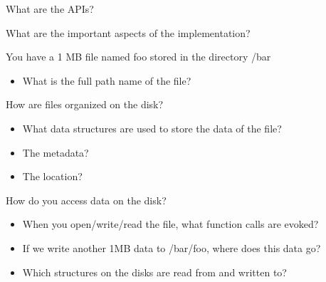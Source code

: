 \begin{slide}


    What are the APIs?
    \bigskip

    What are the important aspects of the implementation?

\end{slide}

\begin{slide}


    You have a 1 MB file named foo stored in the directory /bar
    \begin{itemize}
        \item What is the full path name of the file?
    \end{itemize}
    \bigskip

    How are files organized on the disk? 
    \begin{itemize}
        \item What data structures are used to store the data of the file?
        \item The metadata?
        \item The location?
    \end{itemize}
    \bigskip

    How do you access data on the disk?
    \begin{itemize}
        \item When you open/write/read the file, what function calls are evoked?
        \item If we write another 1MB data to /bar/foo, where does this data go?
        \item Which structures on the disks are read from and written to?
    \end{itemize}

\end{slide}

